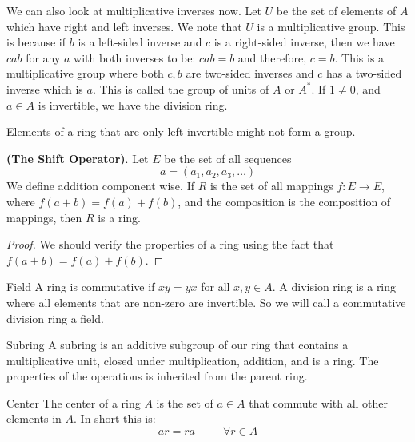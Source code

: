 \documentclass{report}
\begin{document}
We can also look at multiplicative inverses now. Let $U$ be the set of elements of $A$ which have right and left inverses. We note that $U$ is a multiplicative group. This is because if $b$ is a left-sided inverse and $c$ is a right-sided inverse, then we have $cab$ for any $a$ with both inverses to be: $cab = b$ and therefore, $c = b$. This is a multiplicative group where both $c, b$ are two-sided inverses and $c$ has a two-sided inverse which is $a$. This is called the group of units of $A$ or $A^{*}$. If $1 \neq 0$, and $a \in A$ is invertible, we have the division ring.

Elements of a ring that are only left-invertible might not form a group.

\begin{examples}
    \begin{example}
        \textbf{(The Shift Operator)}. Let $E$ be the set of all sequences
            \begin{equation*}
                a = (a_{1}, a_{2}, a_{3}, \ldots)
            \end{equation*}
        We define addition component wise. If $R$ is the set of all mappings $f : E \rightarrow E$, where $f(a + b) = f(a) + f(b)$, and the composition is the composition of mappings, then $R$ is a ring. 
                \begin{proof}
                    We should verify the properties of a ring using the fact that $f(a + b) =  f(a) + f(b)$.
                \end{proof}
    \end{example}
\end{examples}

\begin{definition}{Field}
    A ring is commutative if $xy = yx$ for all $x, y \in A$. A division ring is a ring where all elements that are non-zero are invertible. So we will call a commutative division ring a field.
\end{definition}

\begin{definition}{Subring}
     A subring is an additive subgroup of our ring that contains a multiplicative unit, closed under multiplication, addition, and is a ring. The properties of the operations is inherited from the parent ring. 
\end{definition}

\begin{definition}{Center}
    The center of a ring $A$ is the set of $a \in A$ that commute with all other elements in $A$. In short this is:
    \begin{equation*}
        ar = ra \hspace{30pt} \forall r \in A
    \end{equation*}
\end{definition}
\end{document}
